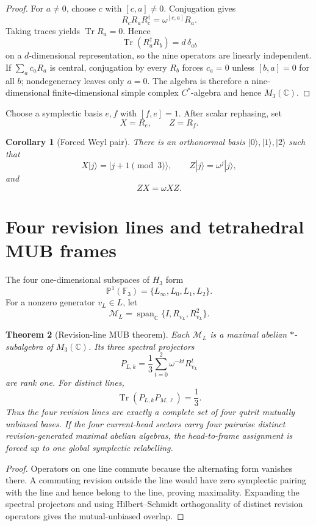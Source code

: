 \documentclass[11pt,oneside,openany]{book}
\numberwithin{equation}{chapter}
\newtheorem{theorem}{Theorem}[chapter]
\newtheorem{corollary}[theorem]{Corollary}
\theoremstyle{definition}
\theoremstyle{remark}
\newcommand{\C}{\mathbb C}
\newcommand{\Tr}{\operatorname{Tr}}
\newcommand{\Span}{\operatorname{span}}
\begin{document}
\begin{proof}
For \(a\ne0\), choose \(c\) with \([c,a]\ne0\).  Conjugation gives
\[
 R_cR_aR_c^\dagger=\omega^{[c,a]}R_a.
\]
Taking traces yields \(\Tr R_a=0\).  Hence
\[
 \Tr(R_a^\dagger R_b)=d\,\delta_{ab}
\]
on a \(d\)-dimensional representation, so the nine operators are linearly
independent.  If \(\sum_ac_aR_a\) is central, conjugation by every \(R_b\)
forces \(c_a=0\) unless \([b,a]=0\) for all \(b\); nondegeneracy leaves only
\(a=0\).  The algebra is therefore a nine-dimensional finite-dimensional
simple complex \(C^*\)-algebra and hence \(M_3(\C)\).
\end{proof}

Choose a symplectic basis \(e,f\) with \([f,e]=1\).  After scalar rephasing,
set
\[
 X=R_e,
 \qquad
 Z=R_f.
\]

\begin{corollary}[Forced Weyl pair]
\label{cor:forced-Weyl}
There is an orthonormal basis \(|0\rangle,|1\rangle,|2\rangle\) such that
\[
 \boxed{
 X|j\rangle=|j+1\!\!\pmod3\rangle,
 \qquad
 Z|j\rangle=\omega^j|j\rangle,}
\]
and
\[
 \boxed{ZX=\omega XZ.}
\]
\end{corollary}

\section{Four revision lines and tetrahedral MUB frames}

The four one-dimensional subspaces of \(H_3\) form
\[
 \mathbb P^1(\mathbb F_3)
 =
 \{L_\infty,L_0,L_1,L_2\}.
\]
For a nonzero generator \(v_L\in L\), let
\[
 \mathcal M_L
 =
 \Span_\C\{I,R_{v_L},R_{v_L}^2\}.
\]

\begin{theorem}[Revision-line MUB theorem]
\label{thm:revision-MUB}
Each \(\mathcal M_L\) is a maximal abelian \(*\)-subalgebra of \(M_3(\C)\).
Its three spectral projectors
\[
 P_{L,k}
 =
 \frac13\sum_{t=0}^2\omega^{-kt}R_{v_L}^t
\]
are rank one.  For distinct lines,
\[
 \boxed{
 \Tr(P_{L,k}P_{M,\ell})=\frac13.}
\]
Thus the four revision lines are exactly a complete set of four qutrit
mutually unbiased bases.  If the four current-head sectors carry four
pairwise distinct revision-generated maximal abelian algebras, the
head-to-frame assignment is forced up to one global symplectic relabelling.
\end{theorem}

\begin{proof}
Operators on one line commute because the alternating form vanishes there.
A commuting revision outside the line would have zero symplectic pairing
with the line and hence belong to the line, proving maximality.  Expanding
the spectral projectors and using Hilbert--Schmidt orthogonality of distinct
revision operators gives the mutual-unbiased overlap.
\end{proof}
\end{document}

